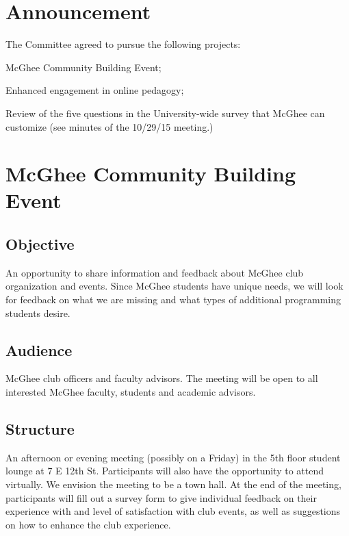 \documentclass[10pt]{meetingmins}
\begin{document}
\maketitle
\section{Announcement}
The Committee agreed to pursue the following projects:
\begin{hiddenitems}
\item McGhee Community Building Event;
\item Enhanced engagement in online pedagogy;
\item Review of the five questions in the University-wide survey that McGhee can customize (see minutes of the 10/29/15 meeting.)
\end{hiddenitems}	
	
\section{McGhee Community Building Event}
\subsection{Objective}
An opportunity  to share information and feedback about McGhee club organization and events. Since McGhee students have unique needs, we will look for feedback on what we are missing and what types of additional programming students desire.
\subsection{Audience}
McGhee club officers and faculty advisors. The meeting will be open to all interested McGhee faculty, students and academic advisors.
\subsection{Structure} 
An afternoon or evening meeting (possibly on a Friday) in the 5th floor student lounge at 7 E 12th St. Participants will also have the opportunity to attend virtually. We envision the meeting to be a town hall. At the end of the meeting, participants will fill out a survey form to  give individual feedback on their experience with and level of satisfaction with club events, as well as suggestions on how to enhance the club experience.
\end{document}
